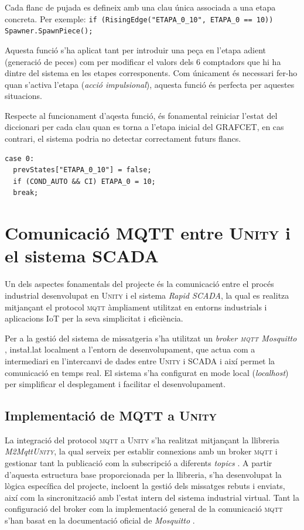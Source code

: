 \documentclass[a4paper,11pt,DIV=13,headings=normal,abstract=true,twoside=semi]{article}
\newcommand{\acro}[1]{\textsc{#1}}
\begin{document}
Cada flanc de pujada es defineix amb una clau única associada a una etapa concreta. Per exemple: \texttt{if (RisingEdge("ETAPA\_0\_10", ETAPA\_0 == 10)) Spawner.SpawnPiece();}

Aquesta funció s'ha aplicat tant per introduir una peça en l'etapa adient (generació de peces) com per modificar el valors dels 6 comptadors que hi ha dintre del sistema en les etapes corresponents. Com únicament és necessari fer-ho quan s'activa l'etapa (\emph{acció impulsional}), aquesta funció és perfecta per aquestes situacions.

Respecte al funcionament d'aqesta funció, és fonamental reiniciar l'estat del diccionari per cada clau quan es torna a l'etapa inicial del \acro{GRAFCET}, en cas contrari, el sistema podria no detectar correctament futurs flancs.

\begin{lstlisting}[style=simple ]
case 0:
  prevStates["ETAPA_0_10"] = false;
  if (COND_AUTO && CI) ETAPA_0 = 10;
  break;
\end{lstlisting}


\newpage
\section{Comunicació MQTT entre \acro{Unity} i el sistema \acro{SCADA}}
\label{sec:mqtt_unity_scada}

Un dels aspectes fonamentals del projecte és la comunicació entre el procés industrial desenvolupat en \acro{Unity} i el sistema \emph{Rapid SCADA}, la qual es realitza mitjançant el protocol \acro{mqtt}  àmpliament utilitzat en entorns industrials i aplicacions IoT per la seva simplicitat i eficiència.

Per a la gestió del sistema de missatgeria s'ha utilitzat un \emph{broker \acro{mqtt} \textit{Mosquitto}} \cite{mosquitto_download}, insta\l.lat localment a l'entorn de desenvolupament, que actua com a intermediari en l'intercanvi de dades entre \acro{Unity} i \acro{SCADA} i així permet la comunicació en temps real. El sistema s'ha configurat en mode local (\emph{localhost}) per simplificar el desplegament i facilitar el desenvolupament.

\subsection{Implementació de \acro{MQTT} a \acro{Unity}}

La integració del protocol \acro{mqtt} a \acro{Unity} s'ha realitzat mitjançant la llibreria \emph{M2Mqtt\acro{Unity}}, la qual serveix per establir connexions amb un broker \acro{mqtt} i gestionar tant la publicació com la subscripció a diferents \emph{topics} \cite{mqtt_unity_guide}. A partir d'aquesta estructura base proporcionada per la llibreria, s'ha desenvolupat la lògica específica del projecte, incloent la gestió dels missatges rebuts i enviats, així com la sincronització amb l'estat intern del sistema industrial virtual. Tant la configuració del broker com la implementació general de la comunicació \acro{mqtt} s'han basat en la documentació oficial de \textit{Mosquitto} \cite{mosquitto_download}.
\end{document}

